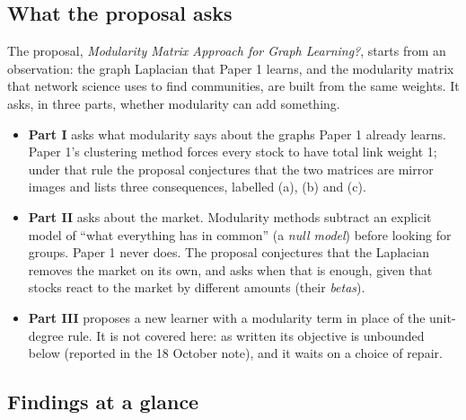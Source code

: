 \documentclass[11pt,a4paper]{article}
\theoremstyle{remark}
\begin{document}
\subsection{What the proposal asks}

The proposal, \emph{Modularity Matrix Approach for Graph Learning?}, starts from an
observation: the graph Laplacian that Paper 1 learns, and the modularity matrix that
network science uses to find communities, are built from the same weights. It asks, in
three parts, whether modularity can add something.
\begin{itemize}
\item \textbf{Part I} asks what modularity says about the graphs Paper 1 already
  learns. Paper 1's clustering method forces every stock to have total link weight 1;
  under that rule the proposal conjectures that the two matrices are mirror images and
  lists three consequences, labelled (a), (b) and (c).
\item \textbf{Part II} asks about the market. Modularity methods subtract an explicit
  model of ``what everything has in common'' (a \emph{null model}) before looking for
  groups. Paper 1 never does. The proposal conjectures that the Laplacian removes the
  market on its own, and asks when that is enough, given that stocks react to the
  market by different amounts (their \emph{betas}).
\item \textbf{Part III} proposes a new learner with a modularity term in place of the
  unit-degree rule. It is not covered here: as written its objective is unbounded below
  (reported in the 18 October note), and it waits on a choice of repair.
\end{itemize}

\subsection{Findings at a glance}
\end{document}
